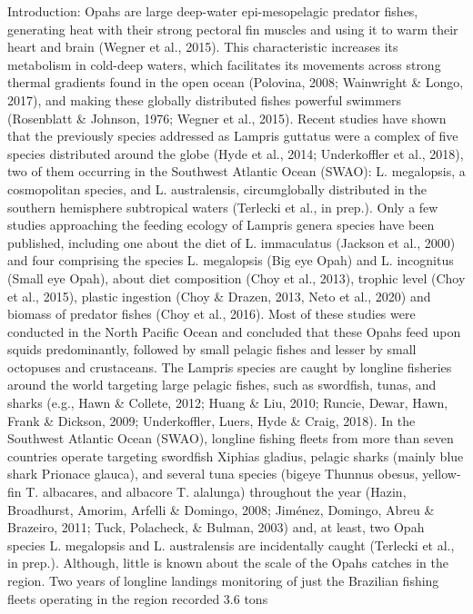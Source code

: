 \documentclass[
]{article}
\begin{document}
Introduction: Opahs are large deep-water epi-mesopelagic predator
fishes, generating heat with their strong pectoral fin muscles and using
it to warm their heart and brain (Wegner et al., 2015). This
characteristic increases its metabolism in cold-deep waters, which
facilitates its movements across strong thermal gradients found in the
open ocean (Polovina, 2008; Wainwright \& Longo, 2017), and making these
globally distributed fishes powerful swimmers (Rosenblatt \& Johnson,
1976; Wegner et al., 2015). Recent studies have shown that the
previously species addressed as Lampris guttatus were a complex of five
species distributed around the globe (Hyde et al., 2014; Underkoffler et
al., 2018), two of them occurring in the Southwest Atlantic Ocean
(SWAO): L. megalopsis, a cosmopolitan species, and L. australensis,
circumglobally distributed in the southern hemisphere subtropical waters
(Terlecki et al., in prep.). Only a few studies approaching the feeding
ecology of Lampris genera species have been published, including one
about the diet of L. immaculatus (Jackson et al., 2000) and four
comprising the species L. megalopsis (Big eye Opah) and L. incognitus
(Small eye Opah), about diet composition (Choy et al., 2013), trophic
level (Choy et al., 2015), plastic ingestion (Choy \& Drazen, 2013, Neto
et al., 2020) and biomass of predator fishes (Choy et al., 2016). Most
of these studies were conducted in the North Pacific Ocean and concluded
that these Opahs feed upon squids predominantly, followed by small
pelagic fishes and lesser by small octopuses and crustaceans. The
Lampris species are caught by longline fisheries around the world
targeting large pelagic fishes, such as swordfish, tunas, and sharks
(e.g., Hawn \& Collete, 2012; Huang \& Liu, 2010; Runcie, Dewar, Hawn,
Frank \& Dickson, 2009; Underkoffler, Luers, Hyde \& Craig, 2018). In
the Southwest Atlantic Ocean (SWAO), longline fishing fleets from more
than seven countries operate targeting swordfish Xiphias gladius,
pelagic sharks (mainly blue shark Prionace glauca), and several tuna
species (bigeye Thunnus obesus, yellow-fin T. albacares, and albacore T.
alalunga) throughout the year (Hazin, Broadhurst, Amorim, Arfelli \&
Domingo, 2008; Jiménez, Domingo, Abreu \& Brazeiro, 2011; Tuck,
Polacheck, \& Bulman, 2003) and, at least, two Opah species L.
megalopsis and L. australensis are incidentally caught (Terlecki et al.,
in prep.). Although, little is known about the scale of the Opahs
catches in the region. Two years of longline landings monitoring of just
the Brazilian fishing fleets operating in the region recorded 3.6 tons
\end{document}

